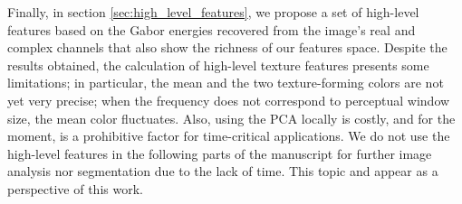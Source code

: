 Finally, in section \ref{sec:high_level_features}, we propose a set of high-level features based on the Gabor energies recovered from the image's real and complex channels that also show the richness of our features space. Despite the results obtained, the calculation of high-level texture features presents some limitations; in particular, the mean and the two texture-forming colors are not yet very precise; when the frequency does not correspond to perceptual window size, the mean color fluctuates. Also, using the PCA locally is costly, and for the moment, is a prohibitive factor for time-critical applications. We do not use the high-level features in the following parts of the manuscript for further image analysis nor segmentation due to the lack of time. This topic and appear as a perspective of this work.

